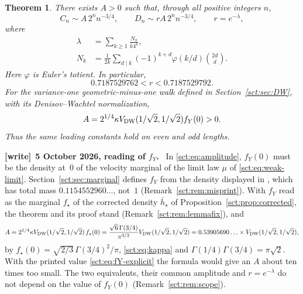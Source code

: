 \documentclass[11pt,letterpaper]{article}
\newtheorem{theorem}{Theorem}[section]
\theoremstyle{definition}\newtheorem{remark}[theorem]{Remark}
\newcommand{\fY}{f_Y}\newcommand{\code}[1]{\texttt{#1}}
\newcommand{\hstar}{\bar h_\star}\newcommand{\fstar}{f_\star}\newcommand{\Kstar}{K_\star}
\newenvironment{writenote}[1][]{\par\smallskip\begingroup\small
 \noindent\textbf{[write]}\if\relax\detokenize{#1}\relax\else~\textbf{#1.}\fi\ }%
 {\par\endgroup\smallskip}
\begin{document}
\begin{theorem}\label{sct:thm:main}
There exists $A>0$ such that, through all positive integers $n$,
\begin{equation}\label{sct:eq:main}
 C_n\sim A\,2^n n^{-3/4},\qquad
 D_n\sim rA\,2^n n^{-3/4},\qquad r=e^{-\lambda},
\end{equation}
where
\begin{align}
 \lambda&=\sum_{k\ge1}\frac{N_k}{k4^k},\label{sct:eq:lambda}\\
 N_k&=\frac1{2k}\sum_{d\mid k}(-1)^{k+d}\varphi(k/d)\binom{2d}{d}.
 \label{sct:eq:EGZ}
\end{align}
Here $\varphi$ is Euler's totient. In particular,
\begin{equation}\label{sct:eq:ratio-bounds}
 0.7187529762<r<0.7187529792.
\end{equation}
For the variance-one geometric-minus-one walk defined in
Section~\ref{sct:sec:DW}, with its Denisov--Wachtel normalization,
\begin{equation}\label{sct:eq:amplitude}
 A=2^{1/4}\kappa\Vdw(1/\sqrt2,1/\sqrt2)\fY(0)>0.
\end{equation}
Thus the same leading constants hold on even and odd lengths.
\end{theorem}
\begin{writenote}[5 October 2026, reading of $\fY$]
In \eqref{sct:eq:amplitude}, $\fY(0)$ must be the density at~$0$ of the velocity marginal of the limit law $\mu$ of \eqref{sct:eq:weak-limit}. Section~\ref{sct:sec:marginal} defines $\fY$ from the density displayed in \cite[Theorem~1]{dw}, which has total mass $0.1154552960\ldots$, not~$1$ (Remark~\ref{sct:rem:misprint}). With $\fY$ read as the marginal $\fstar$ of the corrected density $\hstar$ of Proposition~\ref{sct:prop:corrected}, the theorem and its proof stand (Remark~\ref{sct:rem:lemmafix}), and
\[
 A=2^{1/4}\kappa\Vdw(1/\sqrt2,1/\sqrt2)\,\fstar(0)
 =\frac{\sqrt6\,\Gamma(3/4)}{\pi^{3/2}}\Vdw(1/\sqrt2,1/\sqrt2)
 =0.53905690\ldots\times\Vdw(1/\sqrt2,1/\sqrt2),
\]
by $\fstar(0)=\sqrt{2/3}\,\Gamma(3/4)^2/\pi$, \eqref{sct:eq:kappa} and $\Gamma(1/4)\Gamma(3/4)=\pi\sqrt2$. With the printed value \eqref{sct:eq:fY-explicit} the formula would give an $A$ about ten times too small. The two equivalents, their common amplitude and $r=e^{-\lambda}$ do not depend on the value of $\fY(0)$ (Remark~\ref{sct:rem:scope}).
\end{writenote}
\end{document}
